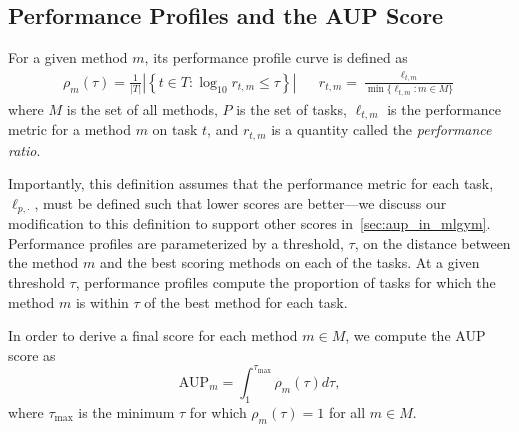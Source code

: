 \subsection{Performance Profiles and the AUP Score}

For a given method $m$, its performance profile curve is defined as 
\begin{align}
\rho_m(\tau) = \frac{1}{|T|} \left|\left\{t \in T: \log_{10}{r_{t,m}} \leq \tau \right\}\right| 
&& 
r_{t,m} = \frac{\ell_{t,m}}{\min\{\ell_{t,m}: m \in M\}}
\end{align}
where $M$ is the set of all methods, $P$ is the set of tasks,
$\ell_{t,m}$ is the performance metric for a method $m$ on task $t$, and $r_{t,m}$ is a quantity called the \textit{performance ratio}. 


%
Importantly, this definition assumes that the performance metric for each task, $\ell_{p,\cdot}$, must be defined such that lower scores are better---we discuss our modification to this definition to support other scores in~\autoref{sec:aup_in_mlgym}. 
%
Performance profiles are parameterized by a threshold, $\tau$, on the distance between the method $m$ and the best scoring methods on each of the tasks. 
%
At a given threshold $\tau$, performance profiles compute the proportion of tasks for which the method $m$ is within $\tau$ of the best method for each task. 

In order to derive a final score for each method $m \in M$, we compute the AUP score as
\begin{equation}
    \text{AUP}_m = \int_{1}^{\tau_\text{max}} \rho_{m}(\tau) d{\tau},
\end{equation}
where $\tau_\text{max}$ is the minimum $\tau$ for which $\rho_{m}(\tau) = 1$ for all $m \in M$.  



